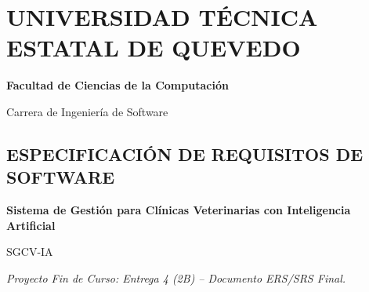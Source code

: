 \documentclass[
]{article}
\author{}
\date{}
\begin{document}
\section*{UNIVERSIDAD TÉCNICA ESTATAL DE
QUEVEDO}\label{universidad-tuxe9cnica-estatal-de-quevedo}

\textbf{Facultad de Ciencias de la Computación}

Carrera de Ingeniería de Software

\subsection{ESPECIFICACIÓN DE REQUISITOS DE
SOFTWARE}\label{especificaciuxf3n-de-requisitos-de-software}

\textbf{Sistema de Gestión para Clínicas Veterinarias con Inteligencia
Artificial}

SGCV-IA

\emph{Proyecto Fin de Curso: Entrega 4 (2B) -- Documento ERS/SRS Final.}
\end{document}
